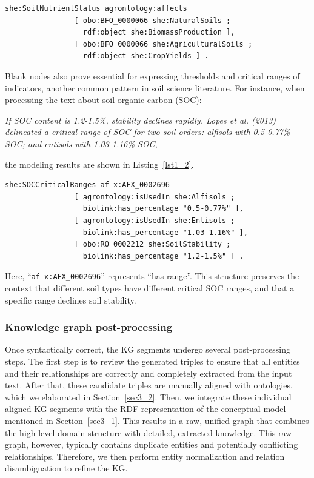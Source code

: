 \documentclass[preprint,12pt]{elsarticle}
\begin{document}
\begin{lstlisting}[style=TurtleStyle, caption={Blank nodes for expressing conditions.}, label={lst1_1}]
she:SoilNutrientStatus agrontology:affects
                [ obo:BFO_0000066 she:NaturalSoils ;
                  rdf:object she:BiomassProduction ],
                [ obo:BFO_0000066 she:AgriculturalSoils ;
                  rdf:object she:CropYields ] .
\end{lstlisting}

Blank nodes also prove essential for expressing thresholds and critical ranges of indicators, another common pattern in soil science literature. For instance, when processing the text about soil organic carbon (SOC):

\textit{If SOC content is 1.2-1.5\%, stability declines rapidly. Lopes et al. (2013) delineated a critical range of SOC for two soil orders: alfisols with 0.5-0.77\% SOC; and entisols with 1.03-1.16\% SOC},

\noindent the modeling results are shown in Listing~\ref{lst1_2}.
\begin{lstlisting}[style=TurtleStyle, caption={Blank nodes for expressing ranges of indicators.}, label={lst1_2}]
she:SOCCriticalRanges af-x:AFX_0002696
                [ agrontology:isUsedIn she:Alfisols ;
                  biolink:has_percentage "0.5-0.77%" ], 
                [ agrontology:isUsedIn she:Entisols ;
                  biolink:has_percentage "1.03-1.16%" ], 
                [ obo:RO_0002212 she:SoilStability ;
                  biolink:has_percentage "1.2-1.5%" ] .
\end{lstlisting}

\noindent Here, ``\texttt{af-x:AFX\_0002696}'' represents ``has range''. This structure preserves the context that different soil types have different critical SOC ranges, and that a specific range declines soil stability.

\subsubsection{Knowledge graph post-processing}
Once syntactically correct, the KG segments undergo several post-processing steps. The first step is to review the generated triples to ensure that all entities and their relationships are correctly and completely extracted from the input text. After that, these candidate triples are manually aligned with ontologies, which we elaborated in Section~\ref{sec3_2}. Then, we integrate these individual aligned KG segments with the RDF representation of the conceptual model mentioned in Section~\ref{sec3_1}. This results in a raw, unified graph that combines the high-level domain structure with detailed, extracted knowledge. This raw graph, however, typically contains duplicate entities and potentially conflicting relationships. Therefore, we then perform entity normalization and relation disambiguation to refine the KG.
\end{document}
